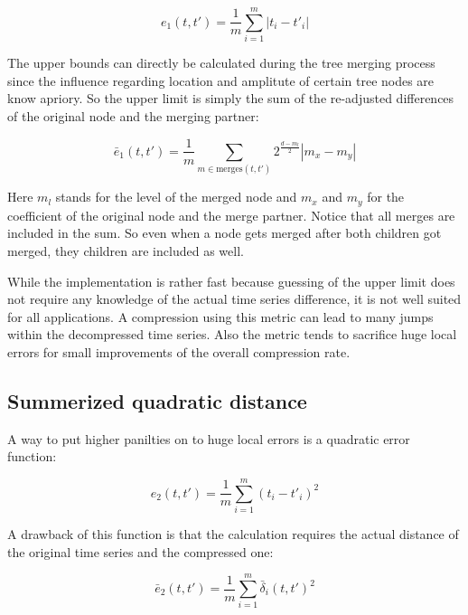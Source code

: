 \begin{equation}\label{eq:e1}
    e_1\left(t, t'\right) = \frac{1}{m} \sum_{i=1}^m \left|t_i - t'_i\right|
\end{equation}

The upper bounds can directly be calculated during the tree merging process since the influence regarding location and amplitute of certain tree nodes are know apriory. So the upper limit is simply the sum of the re-adjusted differences of the original node and the merging partner:

\begin{equation}\label{eq:e1_up}
    \bar{e}_1\left(t, t'\right) = \frac{1}{m} \sum_{m \in \mathrm{merges}(t, t')} 2^\frac{d - m_l}{2} \left|m_x - m_y\right|
\end{equation}

Here $m_l$ stands for the level of the merged node and $m_x$ and $m_y$ for the coefficient of the original node and the merge partner. Notice that all merges are included in the sum. So even when a node gets merged after both children got merged, they children are included as well.

While the implementation is rather fast because guessing of the upper limit does not require any knowledge of the actual time series difference, it is not well suited for all applications. A compression using this metric can lead to many jumps within the decompressed time series. Also the metric tends to sacrifice huge local errors for small improvements of the overall compression rate.


\subsection{Summerized quadratic distance}
\label{ssec:algorithm:error:quadratic}

A way to put higher panilties on to huge local errors is a quadratic error function:

\begin{equation}\label{eq:e2}
    e_2\left(t, t'\right) = \frac{1}{m} \sum_{i=1}^m \left(t_i - t'_i\right)^2
\end{equation}

A drawback of this function is that the calculation requires the actual distance of the original time series and the compressed one:

\begin{equation}\label{eq:e2_up}
    \bar{e}_2\left(t, t'\right) = \frac{1}{m} \sum_{i=1}^m \bar{\delta}_i(t, t')^2
\end{equation}

